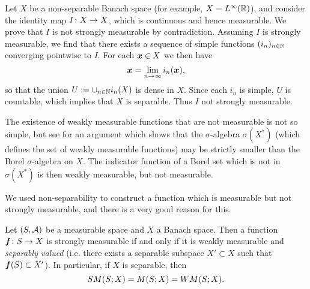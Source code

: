 \begin{example}
  Let $X$ be a non-separable Banach space (for example, $X = L^\infty(\mathbb{R})$), and consider the identity map $I \colon X \rightarrow X$, which is continuous and hence measurable.
  We prove that $I$ is not strongly measurable by contradiction.
  Assuming $I$ is strongly measurable, we find that there exists a sequence of simple functions $(i_n)_{n \in \mathbb{N}}$ converging pointwise to $I$.
  For each $\bm{x} \in X$ we then have
  \begin{equation*}
    \bm{x} = \lim_{n \to \infty} i_n(\bm{x}),
  \end{equation*}
  so that the union $U := \cup_{n \in \mathbb{N}} i_n(X)$ is dense in $X$.
  Since each $i_n$ is simple, $U$ is countable, which implies that $X$ is separable.
  Thus $I$ not strongly measurable.
\end{example}

\begin{rmk}
  The existence of weakly measurable functions that are not measurable is not so simple, but see \cite[Example 1.4.3]{HNVW16} for an argument which shows that the $\sigma$-algebra $\sigma(X^*)$ (which defines the set of weakly measurable functions) may be strictly smaller than the Borel $\sigma$-algebra on $X$.
  The indicator function of a Borel set which is not in $\sigma(X^*)$ is then weakly measurable, but not measurable.
\end{rmk}

We used non-separability to construct a function which is measurable but not strongly measurable, and there is a very good reason for this.

\begin{thm}\label{thm:Pettis-measurability}
  Let $(S,\mathcal{A})$ be a measurable space and $X$ a Banach space.
  Then a function $\bm{f} \colon S \rightarrow X$ is strongly measurable if and only if it is weakly measurable and \emph{separably valued} (i.e. there exists a separable subspace $X' \subset X$ such that $\bm{f}(S) \subset X'$).
  In particular, if $X$ is separable, then
  \begin{equation*}
    SM(S;X) = M(S;X) = WM(S;X).
  \end{equation*}
\end{thm}


